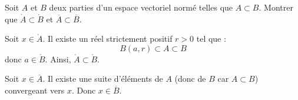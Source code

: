 \documentclass[a4paper,10pt]{report}
\begin{document}
\begin{Exercice}{} Soit $A$ et $B$ deux parties d'un espace vectoriel normé telles que $A \subset B$. Montrer que $\mathring{A} \subset \mathring{B}$ et $\overline{A} \subset \overline{B}$.
\end{Exercice}

\corr Soit $x \in \mathring{A}$. Il existe un réel strictement positif $r>0$ tel que :
$$ B(a,r) \subset A \subset B$$
donc $a \in  \mathring{B}$. Ainsi, $\mathring{A} \subset \mathring{B}$.

\medskip

\noindent Soit $x \in \overline{A}$. Il existe une suite d'éléments de $A$ (donc de $B$ car $A \subset B$) convergeant vers $x$. Donc $x \in \overline{B}$.

%
%
%  




%
%	
%	
%

%
\end{document}
